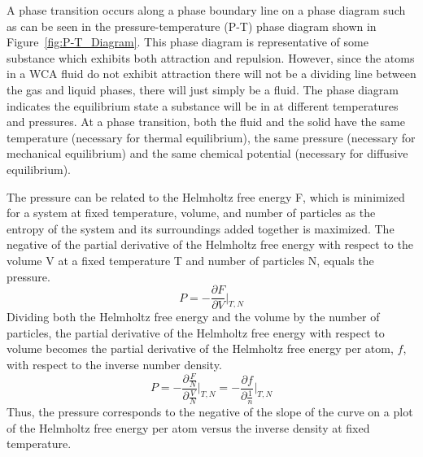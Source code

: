 \documentclass[double,12pt]{beavtex}
\begin{document}
A phase transition occurs along a phase boundary line on a phase diagram
such as can be seen in the pressure-temperature (P-T) phase diagram
shown in Figure~\ref{fig:P-T_Diagram}. 
%
%
This phase diagram is 
representative of some substance 
which exhibits both attraction and repulsion. However, since 
the atoms in a WCA fluid do not exhibit attraction there will not be a 
dividing line between the gas and liquid phases, there will just simply
be a fluid.
The phase diagram indicates the equilibrium state a substance will be in at
different temperatures and pressures.
At a phase transition, both the fluid and the solid have 
the same temperature (necessary 
for thermal equilibrium), the same pressure (necessary for mechanical 
equilibrium) and the same chemical potential (necessary for diffusive equilibrium).

The pressure can be related to the Helmholtz free energy F, which is minimized 
for a system at fixed temperature, volume, and number of particles as the 
entropy of the system and its surroundings added together is maximized. The negative of 
the partial derivative of the Helmholtz free energy with respect to the volume V 
at a fixed temperature T and number of particles N, equals the pressure. 
\begin{equation}{P=-\frac{\partial{F}}{\partial{V}}\bigg|_{T,N}}\end{equation}
\noindent Dividing both the Helmholtz free energy and the volume by the 
number of particles, the partial derivative of the Helmholtz free energy 
with respect to volume becomes the partial derivative of the Helmholtz 
free energy per atom, $f$,  with respect to the inverse number density. 
\begin{equation}{P=-\frac{\partial{\frac{F}{N}}}{\partial{\frac{V}{N}}}\bigg|_{T,N} = -\frac{\partial{f}}{\partial{\frac{1}{n}}}\bigg|_{T,N}}\end{equation} 
Thus, the pressure corresponds to the negative of the slope of the curve 
on a plot of the Helmholtz free energy per atom versus the inverse 
density at fixed temperature. 
 
\end{document}
